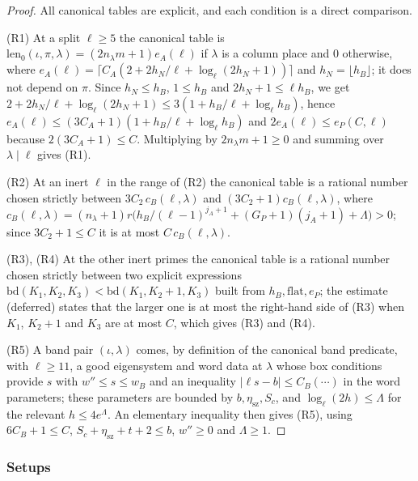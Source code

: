\begin{proof}
All canonical tables are explicit, and each condition is a direct comparison.

(R1) At a split $\ell\ge5$ the canonical table is $\mathrm{len}_0(\iota,\pi,\lambda)=(2n_\lambda m+1)e_A(\ell)$ if $\lambda$ is a column
place and $0$ otherwise, where $e_A(\ell)=\lceil C_A(2+2h_N/\ell+\log_\ell(2h_N+1))\rceil$ and $h_N=\lfloor h_B\rfloor$; it does not depend
on $\pi$. Since $h_N\le h_B$, $1\le h_B$ and $2h_N+1\le\ell h_B$, we get $2+2h_N/\ell+\log_\ell(2h_N+1)\le3(1+h_B/\ell+\log_\ell h_B)$, hence
$e_A(\ell)\le(3C_A+1)(1+h_B/\ell+\log_\ell h_B)$ and $2e_A(\ell)\le e_P(C,\ell)$ because $2(3C_A+1)\le C$. Multiplying by $2n_\lambda m+1\ge0$
and summing over $\lambda\mid\ell$ gives (R1).

(R2) At an inert $\ell$ in the range of (R2) the canonical table is a rational number chosen strictly between $3C_2\,c_B(\ell,\lambda)$ and
$(3C_2+1)c_B(\ell,\lambda)$, where $c_B(\ell,\lambda)=(n_\lambda+1)r\bigl(h_B/(\ell-1)^{j_A+1}+(G_P+1)(j_A+1)+\Lambda\bigr)>0$; since
$3C_2+1\le C$ it is at most $C\,c_B(\ell,\lambda)$.

(R3), (R4) At the other inert primes the canonical table is a rational number chosen strictly between two explicit expressions
$\mathrm{bd}(K_1,K_2,K_3)<\mathrm{bd}(K_1,K_2+1,K_3)$ built from $h_B,\mathrm{flat},e_P$; the estimate
 (deferred) states that the larger one is at most the right-hand side of (R3) when $K_1$, $K_2+1$
and $K_3$ are at most $C$, which gives (R3) and (R4).

(R5) A band pair $(\iota,\lambda)$ comes, by definition of the canonical band predicate, with $\ell\ge11$, a good eigensystem and word
data at $\lambda$ whose box conditions provide $s$ with $w''\le s\le w_B$ and an inequality $|\ell s-b|\le C_B(\cdots)$ in the word
parameters; these parameters are bounded by $b,\eta_{\mathrm{sz}},S_c$, and $\log_\ell(2h)\le\Lambda$ for the relevant $h\le4e^\Lambda$.
An elementary inequality then gives (R5), using $6C_B+1\le C$, $S_c+\eta_{\mathrm{sz}}+t+2\le b$, $w''\ge0$ and $\Lambda\ge1$.
\end{proof}

\subsubsection{Setups}

